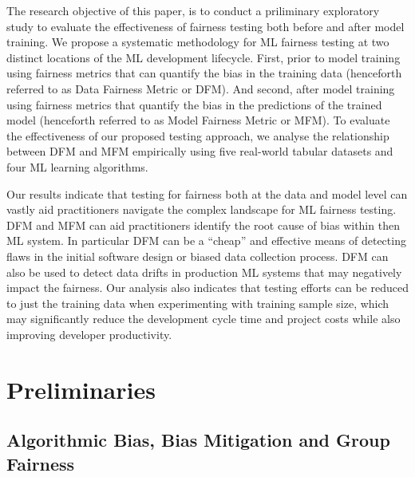 \documentclass{article}
\begin{document}
The research objective of this paper, is to conduct a priliminary
exploratory study to evaluate the effectiveness of fairness testing
both before and after model training. We propose a systematic
methodology for ML fairness testing at two distinct locations of the
ML development lifecycle. First, prior to model training using
fairness metrics that can quantify the bias in the training data
(henceforth referred to as Data Fairness Metric or DFM). And second,
after model training using fairness metrics that quantify the bias in
the predictions of the trained model (henceforth referred to as Model
Fairness Metric or MFM). To evaluate the effectiveness of our proposed
testing approach, we analyse the relationship between DFM and MFM
empirically using five real-world tabular datasets and four ML
learning algorithms.


Our results indicate that testing for fairness both at the data and
model level can vastly aid practitioners navigate the complex
landscape for ML fairness testing. DFM and MFM can aid practitioners
identify the root cause of bias within then ML system. In particular
DFM can be a ``cheap'' and effective means of detecting flaws in the
initial software design or biased data collection process. DFM can
also be used to detect data drifts in production ML systems that may
negatively impact the fairness. Our analysis also indicates that
testing efforts can be reduced to just the training data when
experimenting with training sample size, which may significantly
reduce the development cycle time and project costs while also
improving developer productivity.


\section{Preliminaries}\label{sec:related}




\subsection{Algorithmic Bias, Bias Mitigation and Group Fairness}\label{sec:bias-fairness}
\end{document}
